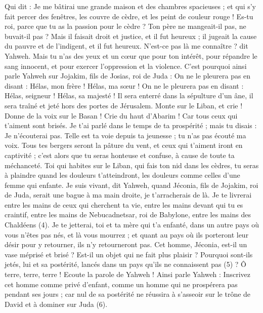 \begin{multicols}{2}
Qui dit : Je me bâtirai une grande maison et des chambres spacieuses ; et qui s’y fait percer des fenêtres, les couvre de cèdre, et les peint de couleur rouge !
Es-tu roi, parce que tu as la passion pour le cèdre ? Ton père ne mangeait-il pas, ne buvait-il pas ? Mais il faisait droit et justice, et il fut heureux ;
il jugeait la cause du pauvre et de l’indigent, et il fut heureux. N’est-ce pas là me connaître ? dit Yahweh.
Mais tu n’as des yeux et un cœur que pour ton intérêt, pour répandre le sang innocent, et pour exercer l’oppression et la violence.
C'est pourquoi ainsi parle Yahweh sur Jojakim, fils de Josias, roi de Juda : On ne le pleurera pas en disant : Hélas, mon frère ! Hélas, ma sœur ! On ne le pleurera pas en disant : Hélas, seigneur ! Hélas, sa majesté !
Il sera enterré dans la sépulture d'un âne, il sera traîné et jeté hors des portes de Jérusalem.
Monte sur le Liban, et crie ! Donne de la voix sur le Basan ! Crie du haut d’Abarim ! Car tous ceux qui t’aiment sont brisés.
Je t'ai parlé dans le temps de ta prospérité ; mais tu disais : Je n'écouterai pas. Telle est ta voie depuis ta jeunesse ; tu n'as pas écouté ma voix.
Tous tes bergers seront la pâture du vent, et ceux qui t’aiment iront en captivité ; c’est alors que tu seras honteuse et confuse, à cause de toute ta méchanceté.
Toi qui habites sur le Liban, qui fais ton nid dans les cèdres,  tu seras à plaindre quand les douleurs t’atteindront, les douleurs comme celles d’une femme qui enfante.
Je suis vivant, dit Yahweh, quand Jéconia, fils de Jojakim, roi de Juda, serait une bague à ma main droite, je t'arracherais de là.
Je te livrerai entre les mains de ceux qui cherchent ta vie, entre les mains devant qui tu es craintif, entre les mains de Nebucadnetsar, roi de Babylone, entre les mains des Chaldéens\FTNT{} (4).
Je te jetterai, toi et ta mère qui t'a enfanté, dans un autre pays où vous n'êtes pas nés, et là vous mourrez ;
et quant au pays où ils porteront leur désir pour y retourner, ils n'y retourneront pas.
Cet homme, Jéconia, est-il un vase méprisé et brisé ? Est-il un objet qui ne fait plus plaisir ? Pourquoi sont-ils jetés, lui et sa postérité, lancés dans un pays qu'ils ne connaissent pas\FTNT{} (5) ?
Ô terre, terre, terre ! Ecoute la parole de Yahweh !
Ainsi parle Yahweh : Inscrivez cet homme comme privé d'enfant, comme un homme qui ne prospérera pas pendant ses jours ; car nul de sa postérité ne réussira à s’asseoir sur le trône de David et à dominer sur Juda\FTNT{} (6).

\end{multicols}
